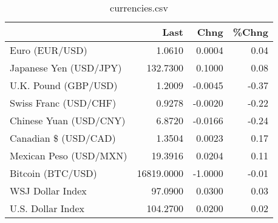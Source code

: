 \documentclass{article}%
\begin{document}
%


\begin{table}[htbp]%
\caption{currencies.csv}%
\centering%
\begin{adjustbox}{width=1\textwidth}%
\begin{tabular}{lrrr}
\toprule
                       &       Last &    Chng &  \%Chng \\
\midrule
        Euro (EUR/USD) &     1.0610 &  0.0004 &   0.04 \\
Japanese Yen (USD/JPY) &   132.7300 &  0.1000 &   0.08 \\
  U.K. Pound (GBP/USD) &     1.2009 & -0.0045 &  -0.37 \\
 Swiss Franc (USD/CHF) &     0.9278 & -0.0020 &  -0.22 \\
Chinese Yuan (USD/CNY) &     6.8720 & -0.0166 &  -0.24 \\
  Canadian \$ (USD/CAD) &     1.3504 &  0.0023 &   0.17 \\
Mexican Peso (USD/MXN) &    19.3916 &  0.0204 &   0.11 \\
     Bitcoin (BTC/USD) & 16819.0000 & -1.0000 &  -0.01 \\
      WSJ Dollar Index &    97.0900 &  0.0300 &   0.03 \\
     U.S. Dollar Index &   104.2700 &  0.0200 &   0.02 \\
\bottomrule
\end{tabular}
%
\end{adjustbox}%
\end{table}

%
\end{document}
